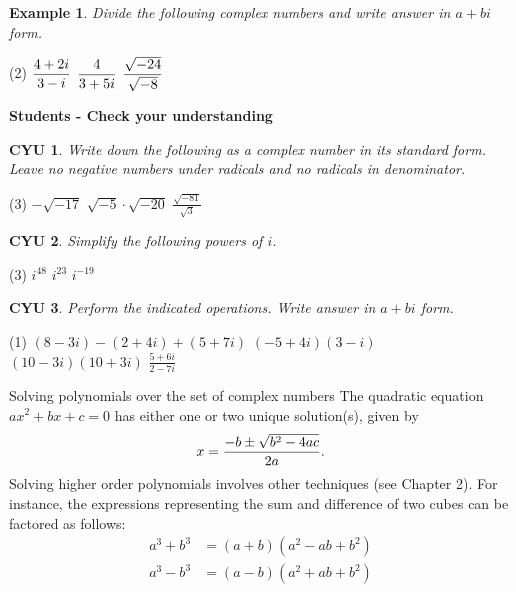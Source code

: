 \documentclass[a4paper, 12pt]{amsbook}
\newcounter{examplecounter}
\newtheorem{example}[examplecounter]{Example}
\newtheorem{checkyourunderstanding}{CYU}%
\begin{document}
\begin{example}
	Divide the following complex numbers and write answer in $a+bi$ form.
\end{example}


\begin{tasks}(2)
	\task \quad $\displaystyle{4+2i\over 3-i}$
	\task \quad $\displaystyle{4\over 3+5i}$
        \task \quad $\displaystyle{\sqrt{-24}\over \sqrt{-8}}$
\end{tasks}

\newpage
\textbf{Students - Check your understanding}

\begin{checkyourunderstanding}
	Write down the following as a complex number in its standard form. Leave no negative numbers under radicals and no radicals in denominator. 
\end{checkyourunderstanding}


\begin{tasks}(3)
	\task \quad $-\sqrt{-17}$
	\task \quad $\sqrt{-5}\cdot\sqrt{-20}$
	\task \quad $\displaystyle\frac{\sqrt{-81}}{\sqrt{3}}$
\end{tasks}
\vfill
\begin{checkyourunderstanding}
	Simplify the following powers of $i$.
\end{checkyourunderstanding}
\begin{tasks}(3)
	\task \quad $i^{48}$
	\task \quad $i^{23}$
	\task \quad $i^{-19}$
\end{tasks}
\vfill
\begin{checkyourunderstanding}
	Perform the indicated operations. Write answer in $a+bi$ form.
\end{checkyourunderstanding}


\begin{tasks}(1)
	\task \quad $\left( 8-3i\right) -\left( 2+4i\right) +\left( 5+7i\right)$
	\task \quad $\left( -5+4i\right) \left( 3-i\right)$
	\task \quad $\left( 10-3i\right) \left( 10+3i\right)$
	\task \quad $\displaystyle\frac{5+6i}{2-7i}$
\end{tasks}
\vfill
\newpage


\begin{objectivebox}{Solving polynomials over the set of complex numbers}{}
The quadratic equation \(ax^2+bx+c=0\) has either one or two unique solution(s), given by \[\displaystyle x={-b\pm\sqrt{b^2-4ac}\over 2a}.\]
Solving higher order polynomials involves other techniques (see Chapter 2). For instance, the expressions representing the sum and difference of two cubes can be factored as follows:
\begin{align*}
	a^3 + b^3 & = (a + b)(a^2 - ab + b^2) \\
	a^3 - b^3 & = (a - b)(a^2 + ab + b^2)
\end{align*}

\end{objectivebox}
\end{document}
